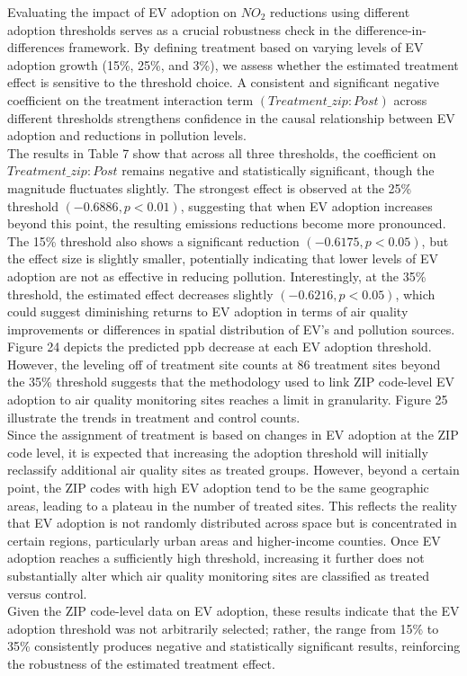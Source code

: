 \documentclass[12pt]{article}
\newcommand\tab[1][.50cm]{\hspace*{#1}}
\begin{document}
	\begin{multicols}{2}
		Evaluating the impact of EV adoption on $NO_2$ reductions using different adoption thresholds serves as a crucial robustness check in the difference-in-differences framework. By defining treatment based on varying levels of EV adoption growth (15\%, 25\%, and 3\%), we assess whether the estimated treatment effect is sensitive to the threshold choice. A consistent and significant negative coefficient on the treatment interaction term $(Treatment\_zip:Post)$ across different thresholds strengthens confidence in the causal relationship between EV adoption and reductions in pollution levels. \\ 
		\tab The results in Table 7 show that across all three thresholds, the coefficient on $Treatment\_zip:Post$ remains negative and statistically significant, though the magnitude fluctuates slightly. The strongest effect is observed at the 25\% threshold $(-0.6886, p<0.01)$, suggesting that when EV adoption increases beyond this point, the resulting emissions reductions become more pronounced. The 15\% threshold also shows a significant reduction $(-0.6175, p<0.05)$, but the effect size is slightly smaller, potentially indicating that lower levels of EV adoption are not as effective in reducing pollution. Interestingly, at the 35\% threshold, the estimated effect decreases slightly $(-0.6216, p<0.05)$, which could suggest diminishing returns to EV adoption in terms of air quality improvements or differences in spatial distribution of EV's and pollution sources. Figure 24 depicts the predicted ppb decrease at each EV adoption threshold. \\ 
		\tab However, the leveling off of treatment site counts at 86 treatment sites beyond the 35\% threshold suggests that the methodology used to link ZIP code-level EV adoption to air quality monitoring sites reaches a limit in granularity. Figure 25 illustrate the trends in treatment and control counts.\\ 
		\tab Since the assignment of treatment is based on changes in EV adoption at the ZIP code level, it is expected that increasing the adoption threshold will initially reclassify additional air quality sites as treated groups. However, beyond a certain point, the ZIP codes with high EV adoption tend to be the same geographic areas, leading to a plateau in the number of treated sites. This reflects the reality that EV adoption is not randomly distributed across space but is concentrated in certain regions, particularly urban areas and higher-income counties. Once EV adoption reaches a sufficiently high threshold, increasing it further does not substantially alter which air quality monitoring sites are classified as treated versus control. \\
		\tab Given the ZIP code-level data on EV adoption, these results indicate that the EV adoption threshold was not arbitrarily selected; rather, the range from 15\% to 35\% consistently produces negative and statistically significant results, reinforcing the robustness of the estimated treatment effect.
	\end{multicols}
	
\end{document}
